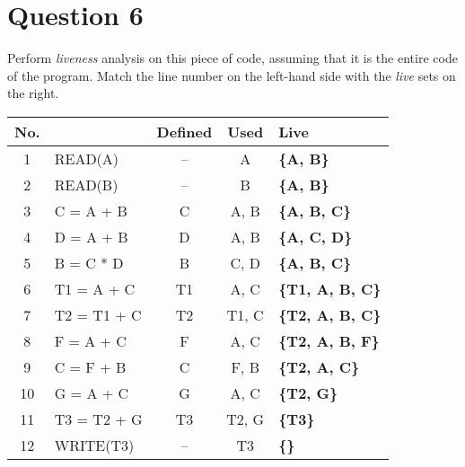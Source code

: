 \documentclass{article}
\begin{document}
\section*{Question 6}
Perform \textit{liveness} analysis on this piece of code, assuming that it is the entire code of the program. Match the line number on the left-hand side with the \textit{live} sets on the right. \\
\begin{tabular}{|c|l|c|c|>{\bfseries}l|}
  \hline
  \textbf{No.} &  & \textbf{Defined} & \textbf{Used} & \textbf{Live} \\
  \hline
  1   & READ(A)     & -- & A     & \{A, B\} \\
  \hline
  2   & READ(B)     & -- & B     & \{A, B\} \\
  \hline
  3   & C = A + B   & C  & A, B  & \{A, B, C\} \\
  \hline
  4   & D = A + B   & D  & A, B  & \{A, C, D\} \\
  \hline
  5   & B = C * D   & B  & C, D  & \{A, B, C\} \\
  \hline
  6   & T1 = A + C  & T1 & A, C  & \{T1, A, B, C\} \\
  \hline
  7   & T2 = T1 + C & T2 & T1, C & \{T2, A, B, C\} \\
  \hline
  8   & F = A + C   & F  & A, C  & \{T2, A, B, F\} \\
  \hline
  9   & C = F + B   & C  & F, B  & \{T2, A, C\} \\
  \hline
  10  & G = A + C   & G  & A, C  & \{T2, G\} \\
  \hline
  11  & T3 = T2 + G & T3 & T2, G & \{T3\} \\
  \hline
  12  & WRITE(T3)   & -- & T3    & \{\} \\
  \hline
\end{tabular}
\end{document}
